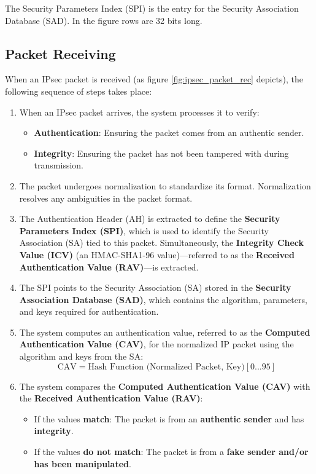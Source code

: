 \begin{tcolorbox}[colback=blue!10!white, colframe=blue!50!white, title=Insight]
The Security Parameters Index (SPI) is the entry for the Security Association Database (SAD). In the figure rows are 32 bits long.
\end{tcolorbox}

\subsection{Packet Receiving}

When an IPsec packet is received (as figure \ref{fig:ipsec_packet_rec} depicts), the following sequence of steps takes place:

\begin{enumerate}
    \item When an IPsec packet arrives, the system processes it to verify:
    \begin{itemize}
        \item \textbf{Authentication}: Ensuring the packet comes from an authentic sender.
        \item \textbf{Integrity}: Ensuring the packet has not been tampered with during transmission.
    \end{itemize}
    
    \item The packet undergoes normalization to standardize its format. Normalization resolves any ambiguities in the packet format.
    
    \item The Authentication Header (AH) is extracted to define the \textbf{Security Parameters Index (SPI)}, which is used to identify the Security Association (SA) tied to this packet. Simultaneously, the \textbf{Integrity Check Value (ICV)} (an HMAC-SHA1-96 value)—referred to as the \textbf{Received Authentication Value (RAV)}—is extracted.
    
    \item The SPI points to the Security Association (SA) stored in the \textbf{Security Association Database (SAD)}, which contains the algorithm, parameters, and keys required for authentication.
    
    \item The system computes an authentication value, referred to as the \textbf{Computed Authentication Value (CAV)}, for the normalized IP packet using the algorithm and keys from the SA:
    \[
    \text{CAV} = \text{Hash Function (Normalized Packet, Key)} [0...95]
    \]
    
    \item The system compares the \textbf{Computed Authentication Value (CAV)} with the \textbf{Received Authentication Value (RAV)}:
    \begin{itemize}
        \item If the values \textbf{match}: The packet is from an \textbf{authentic sender} and has \textbf{integrity}.
        \item If the values \textbf{do not match}: The packet is from a \textbf{fake sender and/or has been manipulated}.
    \end{itemize}
\end{enumerate}


